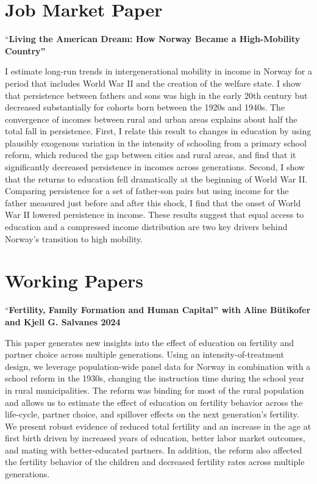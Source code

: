 \documentclass[11pt,]{article}
\begin{document}
\hypertarget{job-market-paper}{%
\section{Job Market Paper}\label{job-market-paper}}

``\textbf{Living the American Dream: How Norway Became a High-Mobility
Country''}

I estimate long-run trends in intergenerational mobility in income in
Norway for a period that includes World War II and the creation of the
welfare state. I show that persistence between fathers and sons was high
in the early 20th century but decreased substantially for cohorts born
between the 1920s and 1940s. The convergence of incomes between rural
and urban areas explains about half the total fall in persistence.
First, I relate this result to changes in education by using plausibly
exogenous variation in the intensity of schooling from a primary school
reform, which reduced the gap between cities and rural areas, and find
that it significantly decreased persistence in incomes across
generations. Second, I show that the returns to education fell
dramatically at the beginning of World War II. Comparing persistence for
a set of father-son pairs but using income for the father measured just
before and after this shock, I find that the onset of World War II
lowered persistence in income. These results suggest that equal access
to education and a compressed income distribution are two key drivers
behind Norway's transition to high mobility.
\vspace{0.3cm}\vspace{-0.2cm}

\vspace{0.5cm}

\clearpage

\hypertarget{working-papers}{%
\section{Working Papers}\label{working-papers}}

``\textbf{Fertility, Family Formation and Human Capital'' with Aline
Bütikofer and Kjell G. Salvanes \hfill 2024}

This paper generates new insights into the effect of education on
fertility and partner choice across multiple generations. Using an
intensity-of-treatment design, we leverage population-wide panel data
for Norway in combination with a school reform in the 1930s, changing
the instruction time during the school year in rural municipalities. The
reform was binding for most of the rural population and allows us to
estimate the effect of education on fertility behavior across the
life-cycle, partner choice, and spillover effects on the next
generation's fertility. We present robust evidence of reduced total
fertility and an increase in the age at first birth driven by increased
years of education, better labor market outcomes, and mating with
better-educated partners. In addition, the reform also affected the
fertility behavior of the children and decreased fertility rates across
multiple generations. \vspace{0.3cm}\vspace{-0.2cm}
\end{document}
